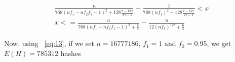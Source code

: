 \documentclass[runningheads]{llncs}
\begin{document}
\begin{gather}
   \frac{n}{768({nf_1 - nf_2f_1 - 1})^2+128\frac{7-12\gamma}{2\gamma - 1}} - \frac{1}{768({nf_1})^2+128\frac{7-12\gamma}{2\gamma - 1}} < x \\
   x <= \frac{n}{768({nf_1-nf_2f_1-1})^2+\frac{6}{5}} - \frac{n}{12({nf_1})^128+\frac{6}{5}} 
\end{gather}    

Now, using ~\ref{eq:13}, if we set $n = 16777186$, $f_1 = 1$ and $f_2 = 0.95$, we get $E(H) = 785312$ hashes

\end{document}
